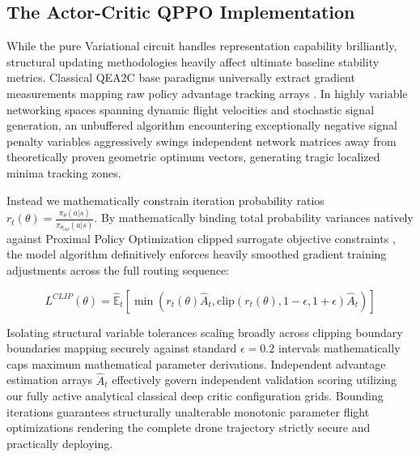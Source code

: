\documentclass[conference]{IEEEtran}
\begin{document}
\subsection{The Actor-Critic QPPO Implementation}
While the pure Variational circuit handles representation capability brilliantly, structural updating methodologies heavily affect ultimate baseline stability metrics. Classical QEA2C base paradigms universally extract gradient measurements mapping raw policy advantage tracking arrays \cite{sasinda2025}. In highly variable networking spaces spanning dynamic flight velocities and stochastic signal generation, an unbuffered algorithm encountering exceptionally negative signal penalty variables aggressively swings independent network matrices away from theoretically proven geometric optimum vectors, generating tragic localized minima tracking zones. 

Instead we mathematically constrain iteration probability ratios $r_t(\theta) = \frac{\pi_\theta(a|s)}{\pi_{\theta_{old}}(a|s)}$. By mathematically binding total probability variances natively against Proximal Policy Optimization clipped surrogate objective constraints \cite{schulman2017}, the model algorithm definitively enforces heavily smoothed gradient training adjustments across the full routing sequence:

\begin{equation} \label{eq:ppo}
L^{CLIP}(\theta) = \hat{\mathbb{E}}_{t} \left[ \min\left( r_t(\theta)\hat{A}_t, \text{clip}(r_t(\theta), 1-\epsilon, 1+\epsilon)\hat{A}_t \right) \right]
\end{equation}

Isolating structural variable tolerances scaling broadly across clipping boundary boundaries mapping securely against standard $\epsilon = 0.2$ intervals mathematically caps maximum mathematical parameter derivations. Independent advantage estimation arrays $\hat{A}_t$ effectively govern independent validation scoring utilizing our fully active analytical classical deep critic configuration grids. Bounding iterations guarantees structurally unalterable monotonic parameter flight optimizations rendering the complete drone trajectory strictly secure and practically deploying.
\end{document}
